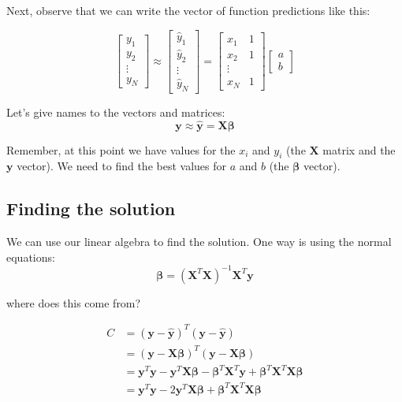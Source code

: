 \documentclass[11pt]{article}
\newcommand\xmtx{\boldsymbol{X}}
\newcommand\betavec{\boldsymbol{\beta}}
\newcommand\yvec{\boldsymbol{y}}
\newcommand\yhat{\hat{y}}
\newcommand\yhatvec{\boldsymbol{\hat{y}}}
\begin{document}
Next, observe that we can write the vector of function predictions like this:

\begin{equation}
    \begin{bmatrix}
        y_1 \\
        y_2 \\
        \vdots \\
        y_N
    \end{bmatrix}
    \approx 
    \begin{bmatrix}
        \yhat_1 \\
        \yhat_2 \\
        \vdots \\
        \yhat_N
    \end{bmatrix}
    =
    \begin{bmatrix}
        x_1 & 1 \\
        x_2 & 1 \\
        \vdots \\
        x_N & 1
    \end{bmatrix}
    \begin{bmatrix}
        a \\ b
    \end{bmatrix}
\end{equation}

Let's give names to the vectors and matrices:
\begin{equation}
    \yvec \approx \yhatvec = \xmtx \betavec
\end{equation}

Remember, at this point we have values for the $x_i$ and $y_i$ (the
$\xmtx$ matrix and the $\yvec$ vector). We need to find the best values
for $a$ and $b$ (the $\betavec$ vector).

\subsection{Finding the solution}

We can use our linear algebra to find the solution. One way is using the normal equations:
\begin{equation}
    \betavec = (\xmtx^T \xmtx)^{-1} \xmtx^T \yvec
\end{equation}

where does this come from?

\begin{equation}
    \begin{aligned}
        C &= ( \yvec - \yhatvec )^T( \yvec - \yhatvec ) \\
          &= ( \yvec - \xmtx \betavec )^T( \yvec - \xmtx\betavec ) \\
          &= \yvec^T \yvec  - \yvec^T \xmtx \betavec - \betavec^T \xmtx^T \yvec + 
                \betavec^T \xmtx^T \xmtx \betavec \\
          &= \yvec^T \yvec  - 2 \yvec^T \xmtx \betavec + \betavec^T \xmtx^T \xmtx \betavec 
    \end{aligned}
\end{equation}
\end{document}
